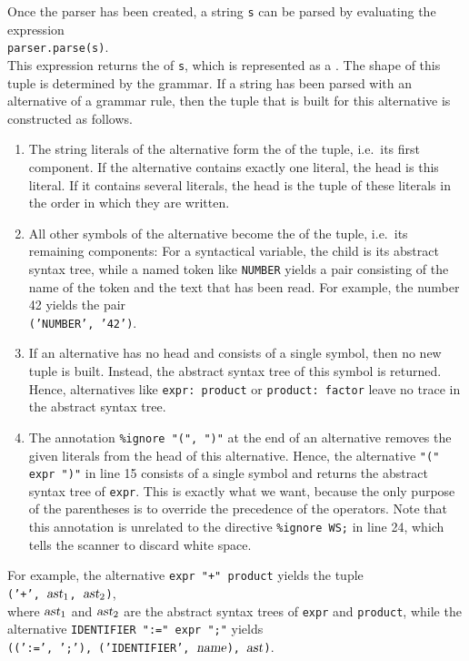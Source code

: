 \noindent
Once the parser has been created, a string \texttt{s} can be parsed by evaluating the expression
\\[0.2cm]
\hspace*{1.3cm}
\texttt{parser.parse(s)}.
\\[0.2cm]
This expression returns the  of \texttt{s}, which is represented as a
.  The shape of this tuple is determined by the grammar.  If a string has been parsed with
an alternative of a grammar rule, then the tuple that is built for this alternative is constructed as follows.
\begin{enumerate}
\item The string literals of the alternative form the 
      of the tuple, i.e.~its first component.  If the alternative contains exactly one literal, the head is
      this literal.  If it contains several literals, the head is the tuple of these literals in the order in
      which they are written.
\item All other symbols of the alternative become the  of the tuple, i.e.~its remaining
      components:  For a syntactical variable, the child is its abstract syntax tree, while a named token like
      \texttt{NUMBER} yields a pair consisting of the name of the token and the text that has been read.
      For example, the number 42 yields the pair
      \\[0.2cm]
      \hspace*{1.3cm}
      \texttt{('NUMBER', '42')}.
\item If an alternative has no head and consists of a single symbol, then no new tuple is built.  Instead,
      the abstract syntax tree of this symbol is returned.  Hence, alternatives like \texttt{expr: product} or
      \texttt{product: factor} leave no trace in the abstract syntax tree.
\item The annotation \texttt{\%ignore "(", ")"} at the end of an alternative removes the given literals from
      the head of this alternative.  Hence, the alternative \texttt{"(" expr ")"} in line 15 consists of a
      single symbol and returns the abstract syntax tree of \texttt{expr}.  This is exactly what we want,
      because the only purpose of the parentheses is to override the precedence of the operators.  Note
      that this annotation is unrelated to the directive \texttt{\%ignore WS;} in line 24, which tells the
      scanner to discard white space.
\end{enumerate}
For example, the alternative \texttt{expr "+" product} yields the tuple
\\[0.2cm]
\hspace*{1.3cm}
\texttt{('+', $\textsl{ast}_1$, $\textsl{ast}_2$)},
\\[0.2cm]
where $\textsl{ast}_1$ and $\textsl{ast}_2$ are the abstract syntax trees of \texttt{expr} and \texttt{product},
while the alternative \texttt{IDENTIFIER ":=" expr ";"} yields
\\[0.2cm]
\hspace*{1.3cm}
\texttt{((':=', ';'), ('IDENTIFIER', $\textsl{name}$), $\textsl{ast}$)}.

